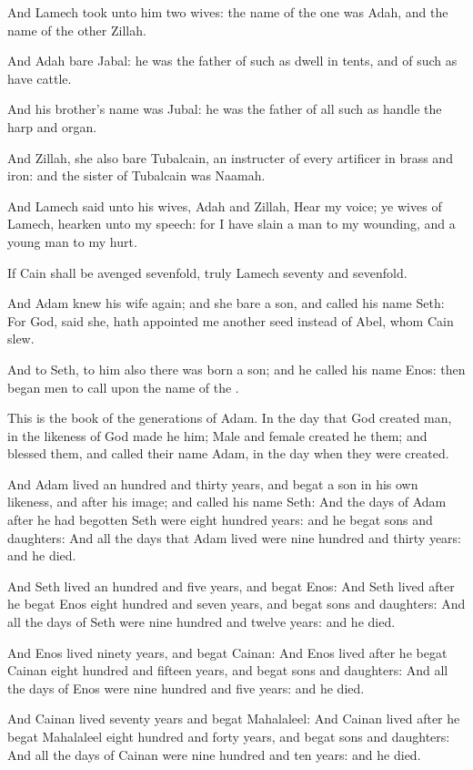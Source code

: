 \Verse And Lamech took unto him two wives: the name of the one was Adah, and the name of the other Zillah.

\Verse And Adah bare Jabal: he was the father of such as dwell in tents, and of such as have cattle.

\Verse And his brother's name was Jubal: he was the father of all such as handle the harp and organ.

\Verse And Zillah, she also bare Tubalcain, an instructer of every artificer in brass and iron: and the sister of Tubalcain was Naamah.

\Verse And Lamech said unto his wives, Adah and Zillah, Hear my voice; ye wives of Lamech, hearken unto my speech: for I have slain a man to my wounding, and a young man to my hurt.

\Verse If Cain shall be avenged sevenfold, truly Lamech seventy and sevenfold.

\Verse And Adam knew his wife again; and she bare a son, and called his name Seth: For God, said she, hath appointed me another seed instead of Abel, whom Cain slew.

\Verse And to Seth, to him also there was born a son; and he called his name Enos: then began men to call upon the name of the \LORD.

\Chapter
\Verse This is the book of the generations of Adam. In the day that God created man, in the likeness of God made he him; \Verse Male and female created he them; and blessed them, and called their name Adam, in the day when they were created.

\Verse And Adam lived an hundred and thirty years, and begat a son in his own likeness, and after his image; and called his name Seth: \Verse And the days of Adam after he had begotten Seth were eight hundred years: and he begat sons and daughters: \Verse And all the days that Adam lived were nine hundred and thirty years: and he died.

\Verse And Seth lived an hundred and five years, and begat Enos: \Verse And Seth lived after he begat Enos eight hundred and seven years, and begat sons and daughters: \Verse And all the days of Seth were nine hundred and twelve years: and he died.

\Verse And Enos lived ninety years, and begat Cainan: \Verse And Enos lived after he begat Cainan eight hundred and fifteen years, and begat sons and daughters: \Verse And all the days of Enos were nine hundred and five years: and he died.

\Verse And Cainan lived seventy years and begat Mahalaleel: \Verse And Cainan lived after he begat Mahalaleel eight hundred and forty years, and begat sons and daughters: \Verse And all the days of Cainan were nine hundred and ten years: and he died.

